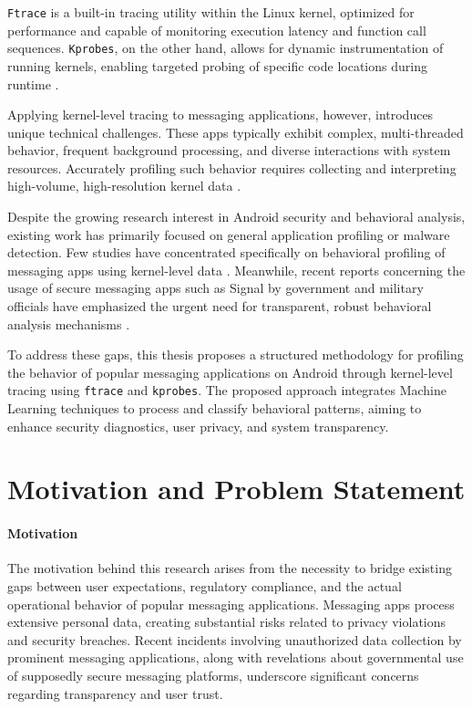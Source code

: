 \documentclass[a4paper,12pt]{report}
\begin{document}
\texttt{Ftrace} is a built-in tracing utility within the Linux kernel, optimized for performance and capable of monitoring execution latency and function call sequences. \texttt{Kprobes}, on the other hand, allows for dynamic instrumentation of running kernels, enabling targeted probing of specific code locations during runtime \cite{corbet2015drivers}.

Applying kernel-level tracing to messaging applications, however, introduces unique technical challenges. These apps typically exhibit complex, multi-threaded behavior, frequent background processing, and diverse interactions with system resources. Accurately profiling such behavior requires collecting and interpreting high-volume, high-resolution kernel data \cite{tang2017profiling, kim2016io}.

Despite the growing research interest in Android security and behavioral analysis, existing work has primarily focused on general application profiling or malware detection. Few studies have concentrated specifically on behavioral profiling of messaging apps using kernel-level data \cite{backes2015boxify}. Meanwhile, recent reports concerning the usage of secure messaging apps such as Signal by government and military officials have emphasized the urgent need for transparent, robust behavioral analysis mechanisms \cite{washingtonpost2023signal}.

To address these gaps, this thesis proposes a structured methodology for profiling the behavior of popular messaging applications on Android through kernel-level tracing using \texttt{ftrace} and \texttt{kprobes}. The proposed approach integrates Machine Learning techniques to process and classify behavioral patterns, aiming to enhance security diagnostics, user privacy, and system transparency.

\section{Motivation and Problem Statement}
\paragraph{Motivation}
The motivation behind this research arises from the necessity to bridge existing gaps between user expectations, regulatory compliance, and the actual operational behavior of popular messaging applications. Messaging apps process extensive personal data, creating substantial risks related to privacy violations and security breaches. Recent incidents involving unauthorized data collection by prominent messaging applications, along with revelations about governmental use of supposedly secure messaging platforms, underscore significant concerns regarding transparency and user trust.
\end{document}
